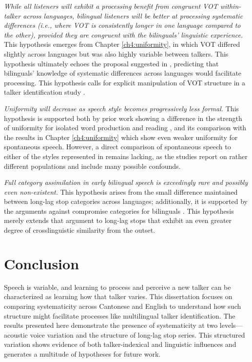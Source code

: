 \textit{While all listeners will exhibit a processing benefit from congruent VOT within-talker across languages, bilingual listeners will be better at processing systematic differences (i.e., where VOT is consistently longer in one language compared to the other), provided they are congruent with the bilinguals' linguistic experience.} This hypothesis emerges from Chapter \ref{ch4:uniformity}, in which VOT differed slightly across languages but was also highly variable between talkers. This hypothesis ultimately echoes the proposal suggested in \citet{orena_2019_identifying}, predicting that bilinguals' knowledge of systematic differences across languages would facilitate processing. This hypothesis calls for explicit manipulation of VOT structure in a talker identification study \citep[e.g., a bilingual adaptation of][]{ganugapati_2019_structured}.

\textit{Uniformity will decrease as speech style becomes progressively less formal.} This hypothesis is supported both by prior work showing a difference in the strength of uniformity for isolated word production and reading \citep{chodroff_2017_structure}, and its comparison with the results in Chapter \ref{ch4:uniformity} which show even weaker uniformity for spontaneous speech. However, a direct comparison of spontaneous speech to either of the styles represented in \citet{chodroff_2017_structure} remains lacking, as the studies report on rather different populations and include many possible confounds. 

\textit{Full category assimilation in early bilingual speech is exceedingly rare and possibly even non-existent.} This hypothesis arises from the small difference maintained between long-lag stop categories across languages; additionally, it is supported by the arguments against compromise categories for bilinguals \citep{casillas_2021_interlingual}. This hypothesis merely extends that argument to long-lag stops that exhibit an even greater degree of crosslinguistic similarity from the outset.  

\section{Conclusion}\label{ch5:sec:conclusion}

Speech is variable, and learning to process and perceive a new talker can be characterized as learning how that talker varies. This dissertation focuses on comparing systematicity across Cantonese and English to understand how such structure might facilitate processes like multilingual talker identification. The results presented here demonstrate the presence of systematicity at two levels---acoustic voice variation and the structure of long-lag stop series. This structured variation shows evidence of both talker-indexical and linguistic influences and generates a multitude of hypotheses for future work. 

